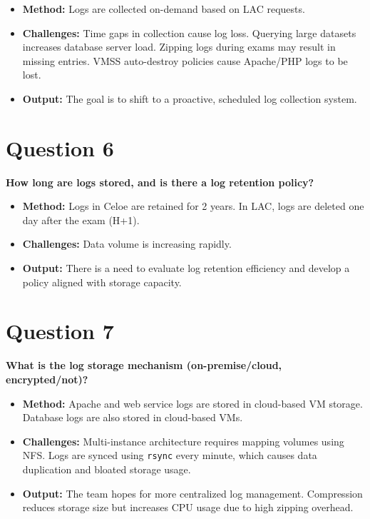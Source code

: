 \begin{itemize}
	\item \textbf{Method:} Logs are collected on-demand based on LAC requests.
	\item \textbf{Challenges:} Time gaps in collection cause log loss. Querying large datasets increases database server load. Zipping logs during exams may result in missing entries. VMSS auto-destroy policies cause Apache/PHP logs to be lost.
	\item \textbf{Output:} The goal is to shift to a proactive, scheduled log collection system.
\end{itemize}

\section*{Question 6}
\textbf{How long are logs stored, and is there a log retention policy?}

\begin{itemize}
	\item \textbf{Method:} Logs in Celoe are retained for 2 years. In LAC, logs are deleted one day after the exam (H+1).
	\item \textbf{Challenges:} Data volume is increasing rapidly.
	\item \textbf{Output:} There is a need to evaluate log retention efficiency and develop a policy aligned with storage capacity.
\end{itemize}

\section*{Question 7}
\textbf{What is the log storage mechanism (on-premise/cloud, encrypted/not)?}

\begin{itemize}
	\item \textbf{Method:} Apache and web service logs are stored in cloud-based VM storage. Database logs are also stored in cloud-based VMs.
	\item \textbf{Challenges:} Multi-instance architecture requires mapping volumes using NFS. Logs are synced using \texttt{rsync} every minute, which causes data duplication and bloated storage usage.
	\item \textbf{Output:} The team hopes for more centralized log management. Compression reduces storage size but increases CPU usage due to high zipping overhead.
\end{itemize}

